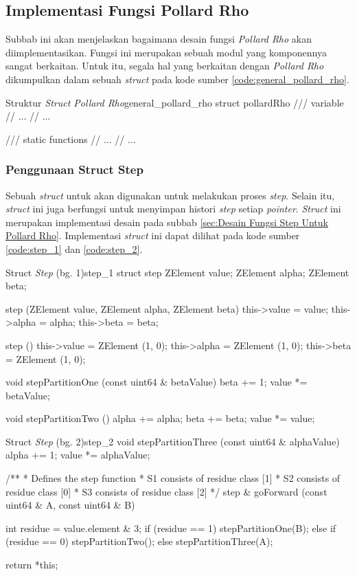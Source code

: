 \subsection{Implementasi Fungsi Pollard Rho}

Subbab ini akan menjelaskan bagaimana desain fungsi \textit{Pollard Rho} akan diimplementasikan. Fungsi ini merupakan sebuah modul yang komponennya sangat berkaitan. Untuk itu, segala hal yang berkaitan dengan \textit{Pollard Rho} dikumpulkan dalam sebuah \textit{struct} pada kode sumber \ref{code:general_pollard_rho}.

\begin{code}[firstnumber=0, float=h!]{Struktur \textit{Struct Pollard Rho}}{general_pollard_rho}
struct pollardRho
/// variable
// ...
// ...

/// static functions
// ...
// ...
\end{code}

\subsubsection{Penggunaan Struct Step}

Sebuah \textit{struct} untuk akan digunakan untuk melakukan proses \textit{step}. Selain itu, \textit{struct} ini juga berfungsi untuk menyimpan histori \textit{step} setiap \textit{pointer}. \textit{Struct} ini merupakan implementasi desain pada subbab \ref{sec:Desain Fungsi Step Untuk Pollard Rho}. Implementasi \textit{struct} ini dapat dilihat pada kode sumber \ref{code:step_1} dan \ref{code:step_2}.

\begin{code}[firstnumber=0, float]{Struct \textit{Step} (bg. 1)}{step_1}
struct step
ZElement value;
ZElement alpha;
ZElement beta;

step (ZElement value, ZElement alpha, ZElement beta)
{
	this->value = value;
	this->alpha = alpha;
	this->beta = beta;
}

step ()
{
	this->value = ZElement (1, 0);
	this->alpha = ZElement (1, 0);
	this->beta = ZElement (1, 0);
}

void stepPartitionOne (const uint64 & betaValue)
{
	beta += 1;
	value *= betaValue;
}

void stepPartitionTwo ()
{
	alpha += alpha;
	beta += beta;
	value *= value;
}
\end{code}
\begin{code}[firstnumber=last, float=h]{Struct \textit{Step} (bg. 2)}{step_2}
void stepPartitionThree (const uint64 & alphaValue)
{
	alpha += 1;
	value *= alphaValue;
}

/**
*  Defines the step function
*  S1 consists of residue class [1]
*  S2 consists of residue class [0]
*  S3 consists of residue class [2]
*/
step & goForward (const uint64 & A, const uint64 & B)
{
	int residue = value.element & 3;
	if      (residue == 1) stepPartitionOne(B);
	else if (residue == 0) stepPartitionTwo();
	else                   stepPartitionThree(A);
	
	return *this;
}
\end{code}


